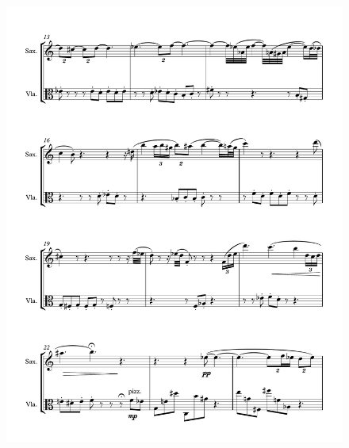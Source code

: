 \begin{figure}[htbp]
    \centering
	\includegraphics[width=6.5in]{figures/Sax_Viola_16.pdf}
\end{figure}

